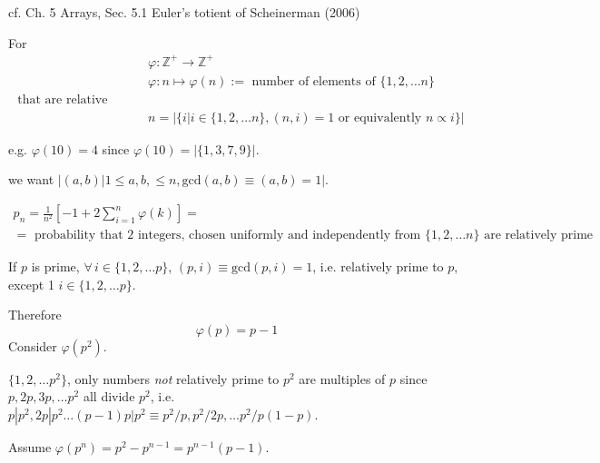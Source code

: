 \documentclass[10pt]{amsart}
\newtheorem{definition}{Definition}
\begin{document}
\begin{multicols*}{2}

cf. Ch. 5 Arrays, Sec. 5.1 Euler's totient of Scheinerman (2006) \cite{Sche2006}

For 
\[
\begin{aligned}
	& \varphi : \mathbb{Z}^+ \to \mathbb{Z}^+ \\ 
	& \varphi : n \mapsto \varphi(n) := \text{ number of elements of } \lbrace 1,2, \dots n \rbrace \\
	\text{ that are relative prime to } \\
	& n = | \lbrace i | i \in \lbrace 1,2, \dots n \rbrace , (n,i)=1 \text{ or equivalently } n \propto i \rbrace |
\end{aligned}
\]

e.g. $\varphi(10) = 4$ since $\varphi(10) = | \lbrace 1,3,7,9\rbrace|$.  

we want $|(a,b) | 1 \leq a,b, \leq n , \text{gcd}(a,b) \equiv (a,b) = 1 |$.  

\[
\begin{gathered}
p_n = \frac{1}{n^2} \left[ -1 + 2\sum_{i=1}^n \varphi(k) \right] = \\
= \text{ probability that 2 integers, chosen uniformly and independently from $\lbrace 1,2,\dots n\rbrace$ are relatively prime }
\end{gathered}
\]

If $p$ is prime, $\forall \, i \in \lbrace 1,2,\dots p \rbrace$, $(p,i) \equiv \text{gcd}(p,i)=1$, i.e. relatively prime to $p$, except 1 $i\in \lbrace 1,2,\dots p\rbrace$.  

Therefore 
\[
\varphi(p) = p-1
\]
Consider $\varphi(p^2)$.  

$\lbrace 1,2,\dots p^2\rbrace$, only numbers \emph{not} relatively prime to $p^2$ are multiples of $p$ since \\
$p,2p, 3p, \dots p^2$ all divide $p^2$, i.e. $p|p^2, 2p|p^2 \dots (p-1)p | p^2 \equiv p^2 /p , p^2 /2p , \dots p^2 / p(1-p)$.  

Assume $\varphi(p^n) = p^2 - p^{n-1} = p^{n-1}(p-1)$.  


\end{multicols*}
\end{document}
